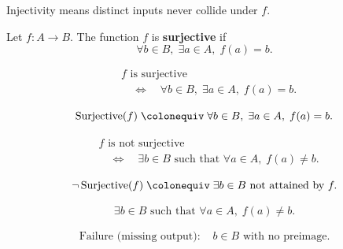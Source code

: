 \begin{remark*}[Interpretation]
Injectivity means distinct inputs never collide under $f$.
\end{remark*}


\begin{tcolorbox}[title={Definition --- Surjective}]
\begin{definition}[Surjective]
\label{def:alg-surjective}
Let $f : A \to B$. The function $f$ is \textbf{surjective} if
\[
\forall b \in B,\; \exists a \in A,\; f(a) = b.
\]
\end{definition}
\end{tcolorbox}

\begin{remark*}
\[
\begin{aligned}
&f \text{ is surjective} \\
&\quad\Longleftrightarrow\quad
\forall b \in B,\; \exists a \in A,\; f(a) = b.
\end{aligned}
\]
\end{remark*}

\begin{remark*}
\[
\operatorname{Surjective}(f)
\;\colonequiv\;
\forall b \in B,\; \exists a \in A,\; f(a) = b.
\]
\end{remark*}

\begin{remark*}
\[
\begin{aligned}
&f \text{ is not surjective} \\
&\quad\Longleftrightarrow\quad
\exists b \in B \text{ such that }
\forall a \in A,\; f(a) \ne b.
\end{aligned}
\]
\end{remark*}

\begin{remark*}
\[
\neg \operatorname{Surjective}(f)
\;\colonequiv\;
\exists b \in B \text{ not attained by } f.
\]
\end{remark*}

\begin{remark*}
\[
\exists b \in B \text{ such that }
\forall a \in A,\; f(a) \ne b.
\]
\end{remark*}

\begin{remark*}
\[
\begin{aligned}
\text{Failure (missing output): } 
&b \in B \text{ with no preimage}.
\end{aligned}
\]
\end{remark*}

